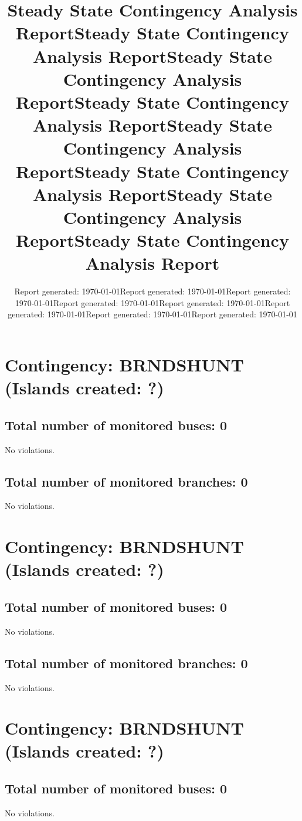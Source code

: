\documentclass{article}%
\title{Steady State Contingency Analysis Report\vspace{-3ex}}%
\date{Report generated: \today\vspace{-2ex}}%
\title{Steady State Contingency Analysis Report\vspace{-3ex}}%
\date{Report generated: \today\vspace{-2ex}}%
\title{Steady State Contingency Analysis Report\vspace{-3ex}}%
\date{Report generated: \today\vspace{-2ex}}%
\title{Steady State Contingency Analysis Report\vspace{-3ex}}%
\date{Report generated: \today\vspace{-2ex}}%
\title{Steady State Contingency Analysis Report\vspace{-3ex}}%
\date{Report generated: \today\vspace{-2ex}}%
\title{Steady State Contingency Analysis Report\vspace{-3ex}}%
\date{Report generated: \today\vspace{-2ex}}%
\title{Steady State Contingency Analysis Report\vspace{-3ex}}%
\date{Report generated: \today\vspace{-2ex}}%
\title{Steady State Contingency Analysis Report\vspace{-3ex}}%
\date{Report generated: \today\vspace{-2ex}}%
\begin{document}
%
\normalsize%
\maketitle%
\section*{Contingency: BRNDSHUNT (Islands created: ?)}%
\label{sec:ContingencyBRNDSHUNT(Islandscreated?)}%
\subsection*{Total number of monitored buses: 0}%
\label{subsec:Totalnumberofmonitoredbuses0}%
No violations.

%
\subsection*{Total number of monitored branches: 0}%
\label{subsec:Totalnumberofmonitoredbranches0}%
No violations.

%
\maketitle%
\section*{Contingency: BRNDSHUNT (Islands created: ?)}%
\label{sec:ContingencyBRNDSHUNT(Islandscreated?)}%
\subsection*{Total number of monitored buses: 0}%
\label{subsec:Totalnumberofmonitoredbuses0}%
No violations.

%
\subsection*{Total number of monitored branches: 0}%
\label{subsec:Totalnumberofmonitoredbranches0}%
No violations.

%
\maketitle%
\section*{Contingency: BRNDSHUNT (Islands created: ?)}%
\label{sec:ContingencyBRNDSHUNT(Islandscreated?)}%
\subsection*{Total number of monitored buses: 0}%
\label{subsec:Totalnumberofmonitoredbuses0}%
No violations.
\end{document}
